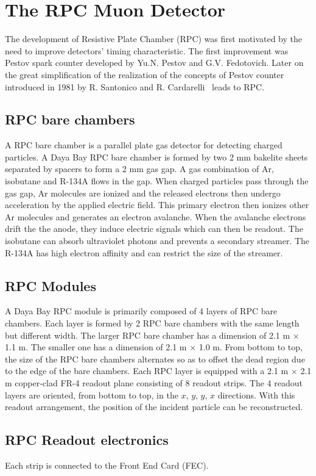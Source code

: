 \chapter{The RPC Muon Detector}

The development of Resistive Plate Chamber (RPC) was first motivated by the need to improve detectors' timing characteristic. The first improvement was Pestov spark counter developed by Yu.N. Pestov and G.V. Fedotovich. Later on the great simplification of the realization of the concepts of Pestov counter introduced in 1981 by R. Santonico and R. Cardarelli~\cite{Santonico1981} leads to RPC.


\section{RPC bare chambers}
A RPC bare chamber is a parallel plate gas detector for detecting charged particles. A Daya Bay RPC bare chamber is formed by two 2 mm bakelite sheets separated by spacers to form a 2 mm gas gap. A gas combination of Ar, isobutane and R-134A flows in the gap. When charged particles pass through the gas gap, Ar molecules are ionized and the released electrons then undergo acceleration by the applied electric field. This primary electron then ionizes other Ar molecules and generates an electron avalanche. When the avalanche electrons drift the the anode, they induce electric signals which can then be readout. The isobutane can absorb ultraviolet photons and prevents a secondary streamer. The R-134A has high electron affinity and can restrict the size of the streamer.


\section{RPC Modules}
A Daya Bay RPC module is primarily composed of 4 layers of RPC bare chambers. Each layer is formed by 2 RPC bare chambers with the same length but different width. The larger RPC bare chamber has a dimension of 2.1 m $\times$ 1.1 m. The smaller one has a dimension of 2.1 m $\times$ 1.0 m. From bottom to top, the size of the RPC bare chambers alternates so as to offset the dead region due to the edge of the bare chambers. Each RPC layer is equipped with a 2.1 m $\times$ 2.1 m copper-clad FR-4 readout plane consisting of 8 readout strips. The 4 readout layers are oriented, from bottom to top, in the $x$, $y$, $y$, $x$ directions. With this readout arrangement, the position of the incident particle can be reconstructed.


\section{RPC Readout electronics}
Each strip is connected to the Front End Card (FEC).